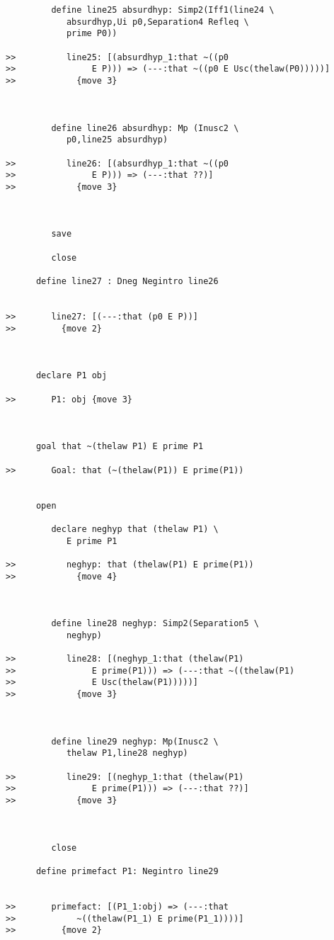 \documentclass[12pt]{article}
\begin{document}
\begin{verbatim}
         define line25 absurdhyp: Simp2(Iff1(line24 \
            absurdhyp,Ui p0,Separation4 Refleq \
            prime P0))

>>          line25: [(absurdhyp_1:that ~((p0
>>               E P))) => (---:that ~((p0 E Usc(thelaw(P0)))))]
>>            {move 3}



         define line26 absurdhyp: Mp (Inusc2 \
            p0,line25 absurdhyp)

>>          line26: [(absurdhyp_1:that ~((p0
>>               E P))) => (---:that ??)]
>>            {move 3}



         save

         close

      define line27 : Dneg Negintro line26


>>       line27: [(---:that (p0 E P))]
>>         {move 2}



      declare P1 obj

>>       P1: obj {move 3}



      goal that ~(thelaw P1) E prime P1

>>       Goal: that (~(thelaw(P1)) E prime(P1))


      open

         declare neghyp that (thelaw P1) \
            E prime P1

>>          neghyp: that (thelaw(P1) E prime(P1))
>>            {move 4}



         define line28 neghyp: Simp2(Separation5 \
            neghyp)

>>          line28: [(neghyp_1:that (thelaw(P1)
>>               E prime(P1))) => (---:that ~((thelaw(P1)
>>               E Usc(thelaw(P1)))))]
>>            {move 3}



         define line29 neghyp: Mp(Inusc2 \
            thelaw P1,line28 neghyp)

>>          line29: [(neghyp_1:that (thelaw(P1)
>>               E prime(P1))) => (---:that ??)]
>>            {move 3}



         close

      define primefact P1: Negintro line29


>>       primefact: [(P1_1:obj) => (---:that
>>            ~((thelaw(P1_1) E prime(P1_1))))]
>>         {move 2}




\end{verbatim}
\end{document}
